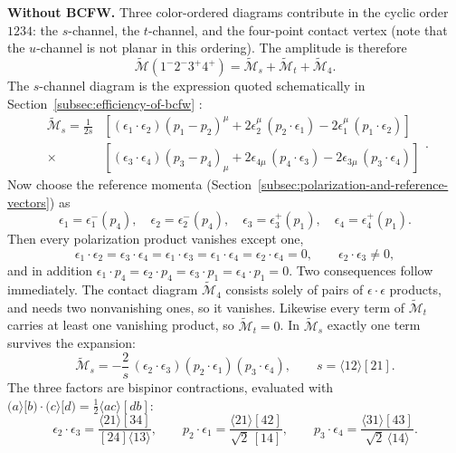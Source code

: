 \textbf{Without BCFW.} Three color-ordered diagrams contribute in the cyclic order $1234$: the $s$-channel, the $t$-channel, and the four-point contact vertex (note that the $u$-channel is not planar in this ordering). The amplitude is therefore
\[
	\widetilde{\mathcal{M}}(1^-2^-3^+4^+) = \widetilde{\mathcal{M}}_s + \widetilde{\mathcal{M}}_t + \widetilde{\mathcal{M}}_{4}
.\]
The $s$-channel diagram is the expression quoted schematically in Section~\ref{subsec:efficiency-of-bcfw} \autocite[(27.95)]{schwartzQFT2014}:
\[
	\begin{aligned}
	\widetilde{\mathcal{M}}_s = \frac{1}{2s}
	&\left[ (\epsilon_1 \cdot \epsilon_2)(p_1 - p_2)^{\mu} + 2\epsilon_2^{\mu}\,(p_2 \cdot \epsilon_1) - 2\epsilon_1^{\mu}\,(p_1 \cdot \epsilon_2) \right] \\
	\times &\left[ (\epsilon_3 \cdot \epsilon_4)(p_3 - p_4)_{\mu} + 2\epsilon_{4\mu}\,(p_4 \cdot \epsilon_3) - 2\epsilon_{3\mu}\,(p_3 \cdot \epsilon_4) \right]
	\end{aligned}
.\]
Now choose the reference momenta (Section~\ref{subsec:polarization-and-reference-vectors}) as
\[
	\epsilon_1 = \epsilon_1^{-}(p_4), \quad
	\epsilon_2 = \epsilon_2^{-}(p_4), \quad
	\epsilon_3 = \epsilon_3^{+}(p_1), \quad
	\epsilon_4 = \epsilon_4^{+}(p_1)
.\]
Then every polarization product vanishes except one,
\[
	\epsilon_1 \cdot \epsilon_2 = \epsilon_3 \cdot \epsilon_4 = \epsilon_1 \cdot \epsilon_3 = \epsilon_1 \cdot \epsilon_4 = \epsilon_2 \cdot \epsilon_4 = 0,
	\qquad
	\epsilon_2 \cdot \epsilon_3 \neq 0,
\]
and in addition $\epsilon_1 \cdot p_4 = \epsilon_2 \cdot p_4 = \epsilon_3 \cdot p_1 = \epsilon_4 \cdot p_1 = 0$. Two consequences follow immediately. The contact diagram $\widetilde{\mathcal{M}}_4$ consists solely of pairs of $\epsilon \cdot \epsilon$ products, and needs two nonvanishing ones, so it vanishes. Likewise every term of $\widetilde{\mathcal{M}}_t$ carries at least one vanishing product, so $\widetilde{\mathcal{M}}_t = 0$. In $\widetilde{\mathcal{M}}_s$ exactly one term survives the expansion:
\[
	\widetilde{\mathcal{M}}_s = -\frac{2}{s}\,(\epsilon_2 \cdot \epsilon_3)(p_2 \cdot \epsilon_1)(p_3 \cdot \epsilon_4),
	\qquad s = \langle 12 \rangle [21]
.\]
The three factors are bispinor contractions, evaluated with $\big(a\rangle[b\big) \cdot \big(c\rangle[d\big) = \tfrac{1}{2}\langle ac \rangle [db]$:
\[
	\epsilon_2 \cdot \epsilon_3 = \frac{\langle 21 \rangle [34]}{[24] \langle 13 \rangle}, \qquad
	p_2 \cdot \epsilon_1 = \frac{\langle 21 \rangle [42]}{\sqrt{2}\, [14]}, \qquad
	p_3 \cdot \epsilon_4 = \frac{\langle 31 \rangle [43]}{\sqrt{2}\, \langle 14 \rangle}
.\]

